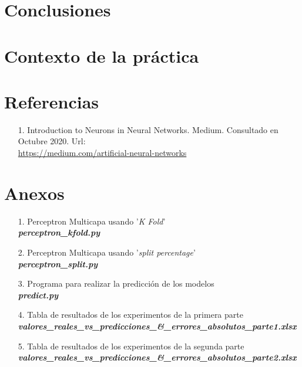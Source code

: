 \documentclass[12pt,a4paper, xcolor=table]{article}
\begin{document}
\section{Conclusiones}

\section{Contexto de la práctica}


\clearpage

\section{Referencias}
    \begin{itemize}
        \item [1.] Introduction to Neurons in Neural Networks. Medium. Consultado en Octubre 2020. Url: \\
        \href{https://medium.com/artificial-neural-networks/introduction-to-neurons-in-neural-networks-71828d040a65}{https://medium.com/artificial-neural-networks}
    \end{itemize}
\printindex



  \section{Anexos}
  \begin{itemize}
    \item [1.] Perceptron Multicapa usando '\textit{K Fold}'\\
    \textbf{\textit{perceptron\_kfold.py}}
    \item [2.] Perceptron Multicapa usando '\textit{split percentage}'\\
    \textbf{\textit{perceptron\_split.py}}
    \item [3.] Programa para realizar la predicción de los modelos\\
    \textbf{\textit{predict.py}}
    \item [4.] Tabla de resultados de los experimentos de la primera parte\\
    \textbf{\textit{valores\_reales\_vs\_predicciones\_\&\_errores\_absolutos\_parte1.xlsx}}
    \item [5.] Tabla de resultados de los experimentos de la segunda parte\\
    \textbf{\textit{valores\_reales\_vs\_predicciones\_\&\_errores\_absolutos\_parte2.xlsx}}
  \end{itemize}
\end{document}
